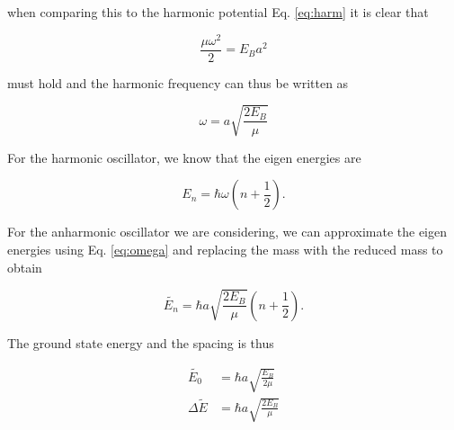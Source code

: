when comparing this to the harmonic potential Eq. \eqref{eq:harm} it is clear that

\begin{equation*}
  \frac{\mu \omega^2}{2} = E_B a^2
\end{equation*}

must hold and the harmonic frequency can thus be written as

\begin{equation}
  \label{eq:omega}
  \omega = a \sqrt{\frac{2 E_B}{\mu}}
\end{equation}

For the harmonic oscillator, we know that the eigen energies are

\begin{equation*}
  E_n = \hbar \omega \left(n + \frac{1}{2} \right).
\end{equation*}

For the anharmonic oscillator we are considering, we can approximate the eigen energies using Eq. \eqref{eq:omega} and replacing the mass with the reduced mass to obtain

\begin{equation}
  \label{eq:enegiesMorse}
  \tilde{E_n} = \hbar a \sqrt{\frac{2 E_B}{\mu}} \left( n + \frac{1}{2}\right).
\end{equation}

The ground state energy and the spacing is thus

\begin{equation*}
  \begin{split}
    \tilde{E_0} & = \hbar a \sqrt{\frac{ E_B}{2\mu}} \\
    \Delta \tilde{E} & = \hbar a \sqrt{\frac{2 E_B}{\mu}}
  \end{split}
\end{equation*}
